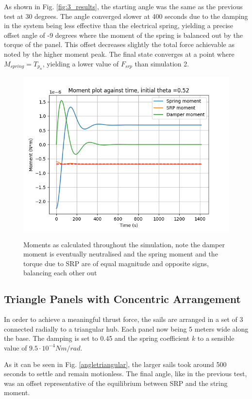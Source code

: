 As shown in Fig. \ref{fig:3_results}, the starting angle was the same as the previous test at 30 degrees. The angle converged slower at 400 seconds due to the damping in the system being less effective than the electrical spring, yielding a precise offset angle of -9 degrees where the moment of the spring is balanced out by the torque of the panel. This offset decreases slightly the total force achievable as noted by the higher moment peak. The final state converges at a point where $M_{spring} = T_{p_n}$, yielding a lower value of $F_{srp}$ than simulation 2.

\begin{figure}[H]
\centering
  \includegraphics[width=0.7\linewidth]{images/third/moment_plot.png}
  \label{fig:3_moment}
\caption{Moments as calculated throughout the simulation, note the damper moment is eventually neutralised and the spring moment and the torque due to SRP are of equal magnitude and opposite signs, balancing each other out}
\label{fig:3_system}
\end{figure}

\subsection{Triangle Panels with Concentric Arrangement}\label{res:triangle}

In order to achieve a meaningful thrust force, the sails are arranged in a set of 3 connected radially to a triangular hub. Each panel now being 5 meters wide along the base. The damping is set to 0.45 and the spring coefficient $k$ to a sensible value of $9.5\cdot10^{-4} Nm/rad$.


As it can be seen in Fig. \ref{angletriangular}, the larger sails took around 500 seconds to settle and remain motionless. The final angle, like in the previous test, was an offset representative of the equilibrium between SRP and the string moment.

